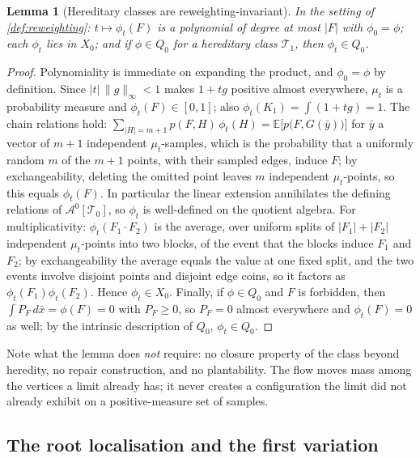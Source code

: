 \documentclass[11pt]{article}
\newtheorem{lemma}[lemma]{Lemma}
\theoremstyle{definition}
\newcommand{\E}{\mathbb{E}}
\newcommand{\A}{\mathcal{A}}
\newcommand{\T}{\mathcal{T}}
\begin{document}
\begin{lemma}[Hereditary classes are reweighting-invariant]\label{lem:reweighting-invariance}
In the setting of \cref{def:reweighting}: $t\mapsto\phi_t(F)$ is a polynomial of degree
at most $|F|$ with $\phi_0=\phi$; each $\phi_t$ lies in $X_0$; and if $\phi\in Q_0$ for
a hereditary class $\T_1$, then $\phi_t\in Q_0$.
\end{lemma}

\begin{proof}
Polynomiality is immediate on expanding the product, and $\phi_0=\phi$ by definition.
Since $|t|\,\|g\|_\infty<1$ makes $1+tg$ positive almost everywhere, $\mu_t$ is a
probability measure and $\phi_t(F)\in[0,1]$; also $\phi_t(K_1)=\int(1+tg)=1$.  The
chain relations hold:
$\sum_{|H|=m+1}p(F,H)\,\phi_t(H)=\E\bigl[p\bigl(F,G(\bar y)\bigr)\bigr]$ for $\bar y$
a vector of $m+1$ independent $\mu_t$-samples, which is the probability that a
uniformly random $m$ of the $m+1$ points, with their sampled edges, induce $F$; by
exchangeability, deleting the omitted point leaves $m$ independent $\mu_t$-points, so
this equals $\phi_t(F)$.  In particular the linear extension annihilates the defining
relations of $\A^0[\T_0]$, so $\phi_t$ is well-defined on the quotient algebra.  For
multiplicativity: $\phi_t(F_1\cdot F_2)$ is the average, over uniform splits of
$|F_1|+|F_2|$ independent $\mu_t$-points into two blocks, of the event that the blocks
induce $F_1$ and $F_2$; by exchangeability the average equals the value at one fixed
split, and the two events involve disjoint points and disjoint edge coins, so it
factors as $\phi_t(F_1)\phi_t(F_2)$.  Hence $\phi_t\in X_0$.  Finally, if
$\phi\in Q_0$ and $F$ is forbidden, then
$\int P_F\,d\bar x=\phi(F)=0$ with $P_F\ge0$, so $P_F=0$ almost everywhere and
$\phi_t(F)=0$ as well; by the intrinsic description of $Q_0$, $\phi_t\in Q_0$.
\end{proof}

Note what the lemma does \emph{not} require: no closure property of the class beyond
heredity, no repair construction, and no plantability.  The flow moves mass among the
vertices a limit already has; it never creates a configuration the limit did not
already exhibit on a positive-measure set of samples.

\subsection{The root localisation and the first variation}
\end{document}
